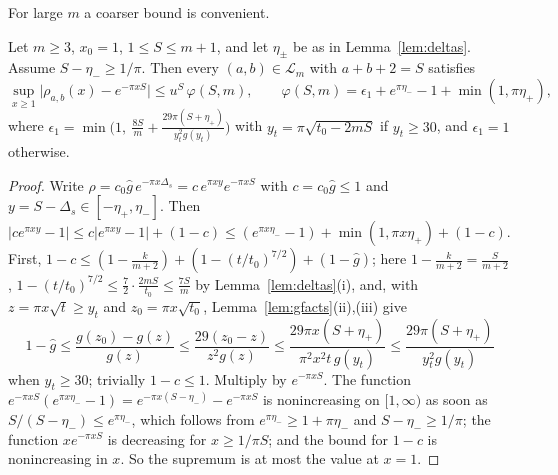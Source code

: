 For large $m$ a coarser bound is convenient.

\begin{lemma}\label{lem:mainS}
Let $m\ge3$, $x_0=1$, $1\le S\le m+1$, and let $\eta_\pm$ be as in Lemma~\ref{lem:deltas}. Assume $S-\eta_-\ge1/\pi$. Then every $(a,b)\in\mathcal L_m$ with $a+b+2=S$ satisfies
\[
\sup_{x\ge1}\big|\rho_{a,b}(x)-e^{-\pi xS}\big|\le u^S\,\varphi(S,m),\qquad \varphi(S,m)=\epsilon_1+e^{\pi\eta_-}-1+\min(1,\pi\eta_+),
\]
where $\epsilon_1=\min\big(1,\ \frac{8S}m+\frac{29\pi(S+\eta_+)}{y_t^2g(y_t)}\big)$ with $y_t=\pi\sqrt{t_0-2mS}$ if $y_t\ge30$, and $\epsilon_1=1$ otherwise.
\end{lemma}

\begin{proof}
Write $\rho=c_0\hat g\,e^{-\pi x\Delta_s}=c\,e^{\pi xy}e^{-\pi xS}$ with $c=c_0\hat g\le1$ and $y=S-\Delta_s\in[-\eta_+,\eta_-]$. Then $|ce^{\pi xy}-1|\le c|e^{\pi xy}-1|+(1-c)\le(e^{\pi x\eta_-}-1)+\min(1,\pi x\eta_+)+(1-c)$. First, $1-c\le(1-\frac k{m+2})+(1-(t/t_0)^{7/2})+(1-\hat g)$; here $1-\frac k{m+2}=\frac S{m+2}$, $1-(t/t_0)^{7/2}\le\frac72\cdot\frac{2mS}{t_0}\le\frac{7S}m$ by Lemma~\ref{lem:deltas}(i), and, with $z=\pi x\sqrt t\ge y_t$ and $z_0=\pi x\sqrt{t_0}$, Lemma~\ref{lem:gfacts}(ii),(iii) give
\[
1-\hat g\le\frac{g(z_0)-g(z)}{g(z)}\le\frac{29(z_0-z)}{z^2g(z)}\le\frac{29\pi x(S+\eta_+)}{\pi^2x^2t\,g(y_t)}\le\frac{29\pi(S+\eta_+)}{y_t^2g(y_t)}
\]
when $y_t\ge30$; trivially $1-c\le1$. Multiply by $e^{-\pi xS}$. The function $e^{-\pi xS}(e^{\pi x\eta_-}-1)=e^{-\pi x(S-\eta_-)}-e^{-\pi xS}$ is nonincreasing on $[1,\infty)$ as soon as $S/(S-\eta_-)\le e^{\pi\eta_-}$, which follows from $e^{\pi\eta_-}\ge1+\pi\eta_-$ and $S-\eta_-\ge1/\pi$; the function $xe^{-\pi xS}$ is decreasing for $x\ge1/\pi S$; and the bound for $1-c$ is nonincreasing in $x$. So the supremum is at most the value at $x=1$.
\end{proof}


